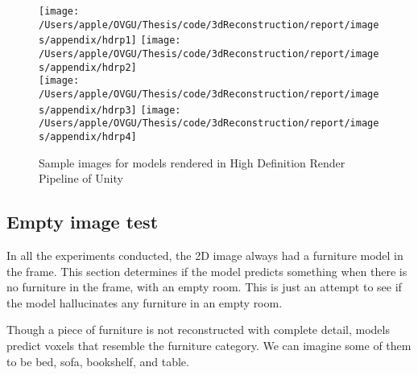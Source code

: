 \begin{figure}[ht]
    \centering
    \texttt{[image: /Users/apple/OVGU/Thesis/code/3dReconstruction/report/images/appendix/hdrp1]}
    \texttt{[image: /Users/apple/OVGU/Thesis/code/3dReconstruction/report/images/appendix/hdrp2]}\\
    \vspace{0.1cm}
    \texttt{[image: /Users/apple/OVGU/Thesis/code/3dReconstruction/report/images/appendix/hdrp3]}
    \texttt{[image: /Users/apple/OVGU/Thesis/code/3dReconstruction/report/images/appendix/hdrp4]}\\
    \caption{Sample images for models rendered in High Definition Render Pipeline of Unity}
    \label{fig:hdrp}
\end{figure}



\subsection{Empty image test}\label{subsec:empty-image-test}
In all the experiments conducted, the 2D image always had a furniture model in the frame.
This section determines if the model predicts something when there is no furniture in the frame, with an empty room.
This is just an attempt to see if the model hallucinates any furniture in an empty room.

Though a piece of furniture is not reconstructed with complete detail, models predict voxels that resemble the furniture category.
We can imagine some of them to be bed, sofa, bookshelf, and table.

